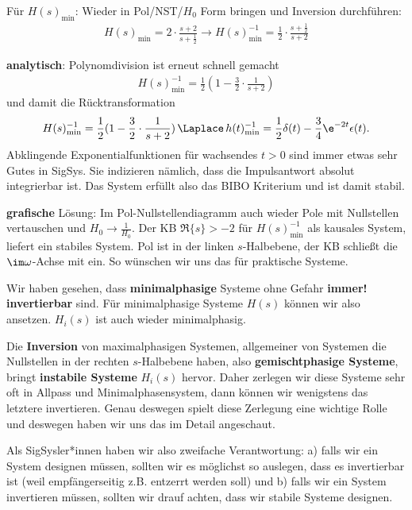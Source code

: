 \begin{Ansatz}
Für $H(s)_\mathrm{min}$:
Wieder in Pol/NST/$H_0$ Form bringen und Inversion durchführen:
\begin{align}
\label{eq:4926427BA9_Hsmininv_series}
H(s)_\mathrm{min} = 2\cdot\frac{s+2}{s+\frac{1}{2}}\rightarrow
H(s)_\mathrm{min}^{-1} = \frac{1}{2}\cdot\frac{s+\frac{1}{2}}{s+2}
\end{align}
\end{Ansatz}

\begin{ExCalc}
\textbf{analytisch}: Polynomdivision ist erneut schnell gemacht
\begin{align}
\label{eq:4926427BA9_Hsmininv_parallel}
H(s)_\mathrm{min}^{-1} = \frac{1}{2} (1-\frac{3}{2}\cdot\frac{1}{s+2})
\end{align}
und damit die Rücktransformation
\begin{align}
H(s)_\mathrm{min}^{-1} = \frac{1}{2} (1-\frac{3}{2}\cdot\frac{1}{s+2})
\,\Laplace\,
h(t)_\mathrm{min}^{-1} = \frac{1}{2}\delta(t) - \frac{3}{4}\e^{-2 t}\epsilon(t).
\end{align}
Abklingende Exponentialfunktionen für wachsendes $t>0$ sind immer etwas sehr
Gutes in SigSys. Sie indizieren nämlich, dass die Impulsantwort absolut
integrierbar ist. Das System erfüllt also das BIBO Kriterium und ist damit stabil.

\noindent\textbf{grafische} Lösung:
Im Pol-Nullstellendiagramm auch wieder Pole mit Nullstellen vertauschen
und $H_0\to\frac{1}{H_0}$. Der KB $\Re\{s\}>-2$ für $H(s)_\mathrm{min}^{-1}$
als kausales System, liefert ein stabiles System. Pol ist in der linken $s$-Halbebene,
der KB schließt die $\im\omega$-Achse mit ein. So wünschen wir uns das für
praktische Systeme.
\end{ExCalc}


\begin{Loesung}
Wir haben gesehen, dass \textbf{minimalphasige} Systeme ohne Gefahr \textbf{immer! invertierbar}
sind. Für minimalphasige Systeme $H(s)$
können wir also  ansetzen.
$H_i(s)$ ist auch wieder minimalphasig.

Die \textbf{Inversion} von maximalphasigen Systemen, allgemeiner von Systemen
die Nullstellen in der rechten $s$-Halbebene haben, also \textbf{gemischtphasige Systeme},
bringt \textbf{instabile Systeme} $H_i(s)$ hervor.
Daher zerlegen wir diese Systeme sehr oft in Allpass und Minimalphasensystem,
dann können wir wenigstens das letztere invertieren. Genau deswegen spielt
diese Zerlegung eine wichtige Rolle und deswegen haben wir uns das im Detail
angeschaut.

Als SigSysler*innen haben wir also zweifache Verantwortung: a) falls wir
ein System designen müssen, sollten wir es möglichst so auslegen, dass es
invertierbar ist (weil empfängerseitig z.B. entzerrt werden soll)
und b) falls wir ein System invertieren müssen, sollten wir
drauf achten, dass wir stabile Systeme designen.

\end{Loesung}

